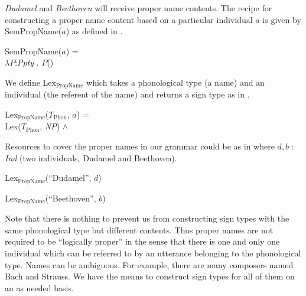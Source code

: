 \textit{Dudamel} and
\textit{Beethoven} will receive proper name contents.  The recipe for
constructing a proper name content based on a particular individual
$a$ is given by SemPropName($a$) as defined in \nexteg{}.
\begin{ex} 
SemPropName($a$) = \\
\hspace*{1em}$\lambda P$:\textit{Ppty} . $P$() 
\end{ex} 
We define Lex$_{\mathrm{PropName}}$ which takes a phonological type (a
name) and an individual (the referent of the name) and returns a sign
type as in \nexteg{}.
\begin{ex} 
Lex$_{\mathrm{PropName}}$($T_{\mathrm{Phon}}$, $a$) = \\
\hspace*{1em}Lex($T_{\mathrm{Phon}}$, \textit{NP}) \d{$\wedge$}  
\end{ex} 
Resources to cover the proper names in our grammar could be as in
\nexteg{} where $d,b$ : \textit{Ind} (two individuals, Dudamel and
Beethoven).
\begin{ex} 
\begin{subex} 
 
\item Lex$_{\mathrm{PropName}}$(``Dudamel'', $d$) 
 
\item Lex$_{\mathrm{PropName}}$(``Beethoven'', $b$) 
 
\end{subex} 
   
\end{ex} 
Note that there is nothing to prevent us from constructing sign types
with the same phonological type but different contents.  Thus proper
names are not required to be ``logically proper'' in the sense that
there is one and only one individual which can be referred to by an
utterance belonging to the phonological type.  Names can be ambiguous.
For example, there are many composers named Bach and Strauss.  We have
the means to construct sign types for all of them on an as needed
basis.

